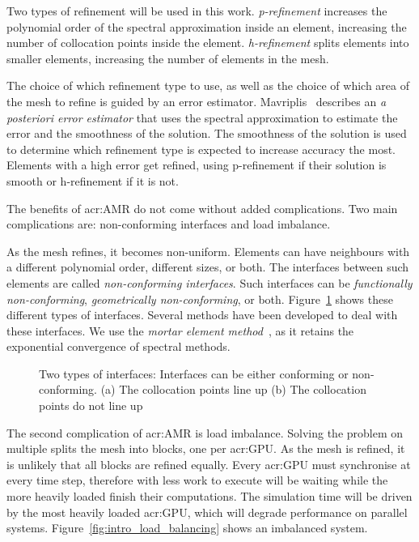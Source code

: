 Two types of refinement will be used in this work. \textit{p-refinement} increases the polynomial
order of the spectral approximation inside an element, increasing the number of collocation points
inside the element. \textit{h-refinement} splits elements into smaller elements, increasing the
number of elements in the mesh.

The choice of which refinement type to use, as well as the choice of which area of the mesh to
refine is guided by an error estimator. Mavriplis~\cite{Mavriplis1990} describes an \textit{a
posteriori error estimator} that uses the spectral approximation to estimate the error and the
smoothness of the solution. The smoothness of the solution is used to determine which refinement
type is expected to increase accuracy the most. Elements with a high error get refined, using
p-refinement if their solution is smooth or h-refinement if it is not.

The benefits of \acrshort{acr:AMR} do not come without added complications. Two main complications
are: non-conforming interfaces and load imbalance.

As the mesh refines, it becomes non-uniform. Elements can have neighbours with a different
polynomial order, different sizes, or both. The interfaces between such elements are called
\textit{non-conforming interfaces}. Such interfaces can be \textit{functionally non-conforming},
\textit{geometrically non-conforming}, or both. Figure~\ref{fig:intro_interfaces} shows these
different types of interfaces. Several methods have been developed to deal with these interfaces. We
use the \textit{mortar element method}~\cite{Maday1989}, as it retains the exponential convergence
of spectral methods.

\begin{figure}[H]
	\centering
	\hfill
	\caption{Two types of interfaces: Interfaces can be either conforming or non-conforming. (a) The collocation points line up (b) The collocation points do not line up}\label{fig:intro_interfaces}
\end{figure}

The second complication of \acrshort{acr:AMR} is load imbalance. Solving the problem on multiple
 splits the mesh into blocks, one per \acrshort{acr:GPU}. As the mesh is
refined, it is unlikely that all blocks are refined equally. Every \acrshort{acr:GPU} must
synchronise at every time step, therefore  with less work to execute will be
waiting while the more heavily loaded  finish their computations. The simulation
time will be driven by the most heavily loaded \acrshort{acr:GPU}, which will degrade performance on
parallel systems. Figure~\ref{fig:intro_load_balancing} shows an imbalanced system.


